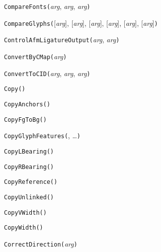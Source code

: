 
\noindent\texttt{CompareFonts(}\textit{arg}, \textit{arg}, \textit{arg}\texttt{)}


\noindent\texttt{CompareGlyphs(}[\textit{arg}], [\textit{arg}], [\textit{arg}], [\textit{arg}], [\textit{arg}], [\textit{arg}]\texttt{)}


\noindent\texttt{ControlAfmLigatureOutput(}\textit{arg}, \textit{arg}\texttt{)}


\noindent\texttt{ConvertByCMap(}\textit{arg}\texttt{)}


\noindent\texttt{ConvertToCID(}\textit{arg}, \textit{arg}, \textit{arg}\texttt{)}


\noindent\texttt{Copy(}\texttt{)}


\noindent\texttt{CopyAnchors(}\texttt{)}


\noindent\texttt{CopyFgToBg(}\texttt{)}


\noindent\texttt{CopyGlyphFeatures(}, \ldots\texttt{)}


\noindent\texttt{CopyLBearing(}\texttt{)}


\noindent\texttt{CopyRBearing(}\texttt{)}


\noindent\texttt{CopyReference(}\texttt{)}


\noindent\texttt{CopyUnlinked(}\texttt{)}


\noindent\texttt{CopyVWidth(}\texttt{)}


\noindent\texttt{CopyWidth(}\texttt{)}


\noindent\texttt{CorrectDirection(}\textit{arg}\texttt{)}

